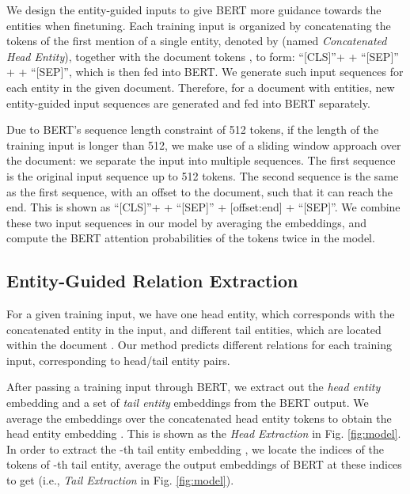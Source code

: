 \documentclass[11pt,a4paper]{article}
\begin{document}
We design the entity-guided inputs to give BERT more guidance towards the entities when finetuning.
Each training input is organized by concatenating the tokens of the first mention of a single entity, denoted by  (named \textit{Concatenated Head Entity}), together with the document tokens , to form: ``[CLS]''+  + ``[SEP]'' +  + ``[SEP]'', which is then fed into BERT. 
We generate such input sequences for each entity in the given document. 
Therefore, for a document with  entities,  new entity-guided input sequences are generated and fed into BERT separately.


Due to BERT's sequence length constraint of 512 tokens, if the length of the training input is longer than 512, we make use of a sliding window approach over the document:
we separate the input into multiple sequences. The first sequence is the original input sequence up to 512 tokens. The second sequence is the same as the first sequence, with an offset to the document, such that it can reach the end.
This is shown as ``[CLS]''+  + ``[SEP]'' + [offset:end] + ``[SEP]''. We combine these two input sequences in our model by averaging the embeddings, and compute the BERT attention probabilities of the tokens twice in the model.

\subsection{Entity-Guided Relation Extraction}\label{subsec:RE}









For a given training input, we have one head entity, which corresponds with the concatenated entity  in the input, and  different tail entities, which are located within the document .
Our method predicts  different relations for each training input, corresponding to  head/tail entity pairs. 

After passing a training input through BERT, we extract out the {\em head entity} embedding and a set of {\em tail entity} embeddings from the BERT output.
We average the embeddings over the concatenated head entity tokens to obtain the head entity embedding .
This is shown as the \textit{Head Extraction} in Fig. \ref{fig:model}. 
In order to extract the -th tail entity embedding , we locate the indices of the tokens of -th tail entity, average the output embeddings of BERT at these indices to get  (i.e., \textit{Tail Extraction} in Fig. \ref{fig:model}).
\end{document}
